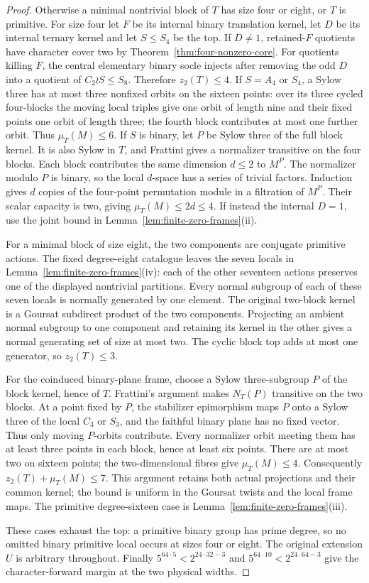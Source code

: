 \begin{proof}
Otherwise a minimal nontrivial block of $T$ has size four or eight,
or $T$ is primitive. For size four let $F$ be its internal binary
translation kernel, let $D$ be its internal ternary kernel and let
$S\leq S_4$ be the top. If $D\ne1$, retained-$F$ quotients
have character cover two by Theorem~\ref{thm:four-nonzero-core}.
For quotients killing $F$, the central elementary binary socle
injects after removing the odd $D$ into a quotient of
$C_2\wr S\leq S_8$. Therefore $z_2(T)\leq4$.
If $S=A_4$ or $S_4$, a Sylow three has at most three nonfixed
orbits on the sixteen points: over its three cycled four-blocks
the moving local triples give one orbit of length nine and their
fixed points one orbit of length three; the fourth block contributes
at most one further orbit. Thus $\mu_T(M)\leq6$.
If $S$ is binary, let $P$ be Sylow three of the full block kernel.
It is also Sylow in $T$, and Frattini gives a normalizer transitive
on the four blocks. Each block contributes the same dimension
$d\leq2$ to $M^P$. The normalizer modulo $P$ is binary, so the
local $d$-space has a series of trivial factors. Induction gives
$d$ copies of the four-point permutation module in a filtration
of $M^P$. Their scalar capacity is two, giving
$\mu_T(M)\leq2d\leq4$. If instead the internal $D=1$, use
the joint bound in Lemma~\ref{lem:finite-zero-frames}(ii).

For a minimal block of size eight, the two components are conjugate
primitive actions. The fixed degree-eight catalogue leaves the seven
locals in Lemma~\ref{lem:finite-zero-frames}(iv): each of the other
seventeen actions preserves one of the displayed nontrivial partitions.
Every normal subgroup of each of these seven locals is normally
generated by one element. The original two-block kernel is a Goursat
subdirect product of the two components. Projecting an ambient normal
subgroup to one component and retaining its kernel in the other gives
a normal generating set of size at most two. The cyclic block top
adds at most one generator, so $z_2(T)\leq3$.

For the coinduced binary-plane frame, choose a Sylow three-subgroup
$P$ of the block kernel, hence of $T$. Frattini's argument makes
$N_T(P)$ transitive on the two blocks. At a point fixed by $P$,
the stabilizer epimorphism maps $P$ onto a Sylow three of the
local $C_3$ or $S_3$, and the faithful binary plane has no fixed
vector. Thus only moving $P$-orbits contribute. Every normalizer
orbit meeting them has at least three points in each block, hence
at least six points. There are at most two on sixteen points;
the two-dimensional fibres give $\mu_T(M)\leq4$. Consequently
$z_2(T)+\mu_T(M)\leq7$. This argument retains both actual
projections and their common kernel; the bound is uniform in the
Goursat twists and the local frame maps. The primitive degree-sixteen case is Lemma~\ref{lem:finite-zero-frames}(iii).

These cases exhaust the top: a primitive binary group has prime
degree, so no omitted binary primitive local occurs at sizes four
or eight. The original extension $U$ is arbitrary throughout.
Finally $5^{64\cdot5}<2^{24\cdot32-3}$ and
$5^{64\cdot10}<2^{24\cdot64-3}$ give the character-forward
margin at the two physical widths.
\end{proof}
